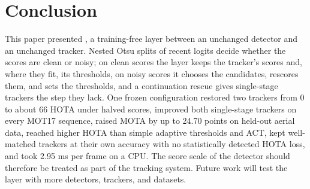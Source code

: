 \section{Conclusion}\label{sec:conclusion}

This paper presented \scl{}, a training-free layer between an unchanged detector and an unchanged
tracker. Nested Otsu splits of recent logits decide whether the scores are clean or noisy; on clean
scores the layer keeps the tracker's scores and, where they fit, its thresholds, on noisy scores it chooses the candidates, rescores
them, and sets the thresholds, and a continuation rescue gives single-stage trackers the step they
lack. One frozen configuration restored two trackers from 0 to about 66 HOTA under halved scores,
improved both single-stage trackers on every MOT17 sequence, raised MOTA by up to 24.70 points on
held-out aerial data, reached higher HOTA than simple adaptive thresholds and ACT, kept well-matched
trackers at their own accuracy with no statistically detected HOTA loss, and took 2.95 ms per frame on a CPU. The score scale of the detector should therefore be treated as part of
the tracking system. Future work will test the layer with more detectors, trackers, and datasets.
